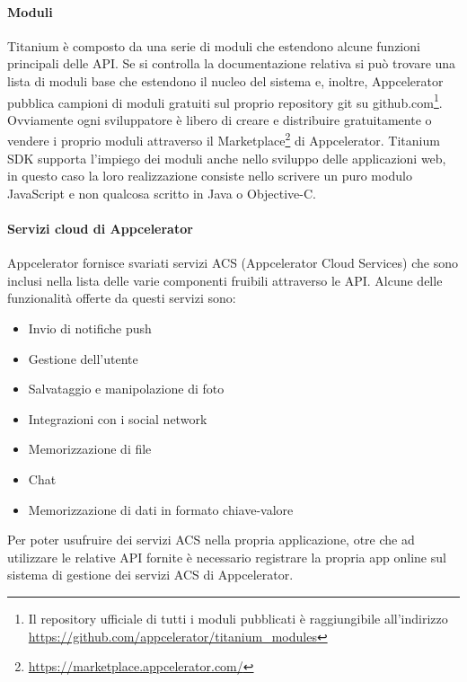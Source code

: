 			\paragraph{Moduli}
				Titanium è composto da una serie di moduli che estendono alcune 
				funzioni principali delle API. Se si controlla la documentazione 
				relativa si può trovare una lista di moduli base che estendono 
				il nucleo del sistema e, inoltre, Appcelerator pubblica 
				campioni di moduli gratuiti sul proprio repository git su 
				\mbox{github.com}\footnote{Il repository ufficiale di tutti i 
				moduli pubblicati è	raggiungibile all'indirizzo 
				\url{https://github.com/appcelerator/titanium_modules}}. 
				Ovviamente ogni sviluppatore è libero di creare e distribuire 
				gratuitamente o vendere i proprio moduli attraverso il 
				Marketplace\footnote{\url{https://marketplace.appcelerator.com/}} 
				di Appcelerator. Titanium SDK supporta l'impiego dei moduli 
				anche nello sviluppo delle applicazioni web, in questo caso la 
				loro realizzazione consiste nello scrivere un puro modulo 
				JavaScript e non qualcosa scritto in Java o Objective-C.
				
			\paragraph{Servizi cloud di Appcelerator}
				Appcelerator fornisce svariati servizi ACS (Appcelerator Cloud 
				Services) che sono inclusi nella lista delle varie componenti 
				fruibili attraverso le API. Alcune delle funzionalità offerte da 
				questi servizi sono:
				\begin{itemize}
					\item Invio di notifiche push
					\item Gestione dell'utente
					\item Salvataggio e manipolazione di foto
					\item Integrazioni con i social network
					\item Memorizzazione di file
					\item Chat
					\item Memorizzazione di dati in formato chiave-valore
				\end{itemize}
				Per poter usufruire dei servizi ACS nella propria applicazione, 
				otre che ad utilizzare le relative API fornite è necessario 
				registrare la propria app online sul sistema di gestione dei 
				servizi ACS di Appcelerator.
			
